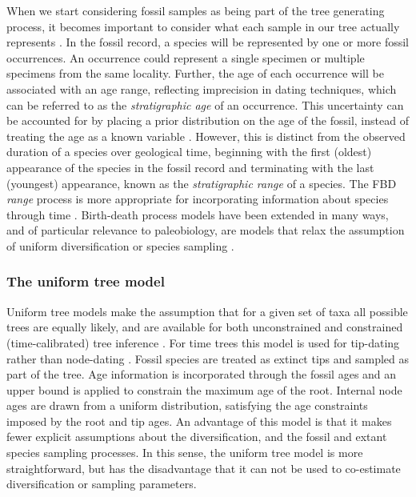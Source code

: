 When we start considering fossil samples as being part of the tree generating process, it becomes important to consider what each sample in our tree actually represents \citep{Hopkins2018}. 
In the fossil record, a species will be represented by one or more fossil occurrences.
An occurrence could represent a single specimen or multiple specimens from the same locality.
Further, the age of each occurrence will be associated with an age range, reflecting imprecision in dating techniques, which can be referred to as the \textit{stratigraphic age} of an occurrence.
This uncertainty can be accounted for by placing a prior distribution on the age of the fossil, instead of treating the age as a known variable \citep{Drummond2016,BaridoSottani2019a}.
However, this is distinct from the observed duration of a species over geological time, beginning with the first (oldest) appearance of the species in the fossil record and terminating with the last (youngest) appearance, known as the \textit{stratigraphic range} of a species.
The FBD \textit{range} process is more appropriate for incorporating information about species through time \citep{Stadler2017}.
Birth-death process models have been extended in many ways, and of particular relevance to paleobiology, are models that relax the assumption of uniform diversification or species sampling \citep{Hoehna2011,Stadler2013b,Gavryushkina2014,Zhang2016,Kuehnert2016,BaridoSottani2018}.

\subsubsection{The uniform tree model}

Uniform tree models make the assumption that for a given set of taxa all possible trees are equally likely, and are available for both unconstrained and constrained (time-calibrated) tree inference \citep{Huelsenbeck2001a,Ronquist2012a}.
For time trees this model is used for tip-dating rather than node-dating \citep{Ronquist2012a}.
Fossil species are treated as extinct tips and sampled as part of the tree.
Age information is incorporated through the fossil ages and an upper bound is applied to constrain the maximum age of the root.
Internal node ages are drawn from a uniform distribution, satisfying the age constraints imposed by the root and tip ages.
An advantage of this model is that it makes fewer explicit assumptions about the diversification, and the fossil and extant species sampling processes. 
In this sense, the  uniform tree model is more straightforward, but has the disadvantage that it can not be used to co-estimate diversification or sampling parameters.

